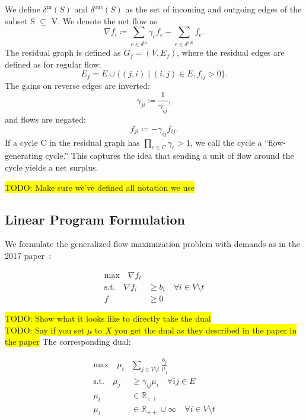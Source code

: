 \documentclass[11pt]{article}
\theoremstyle{definition}
\theoremstyle{definition}
\newcommand{\R}{\mathbb{R}}
\newcommand{\nfi}{\nabla f_i}
\newcommand{\din}{\delta^{\text{in}}}
\newcommand{\dout}{\delta^{\text{out}}}
\newcommand{\todo}[1]{\colorbox{yellow}{TODO: #1}}
\begin{document}
		We define $\din(S)$ and $\dout(S)$ as the set of incoming and outgoing edges of the subset S $\subseteq$ V. We denote the net flow as
    \[ \nfi \coloneqq \sum_{e \in \din} \gamma_e f_e - \sum_{e \in \dout} f_e.\]
    The residual graph is defined as $G_f = (V, E_f)$, where the residual edges are defined
    as for regular flow:
    \[ E_f = E \cup \{ (j, i) \mid (i, j) \in E, f_{ij} > 0 \}. \]
    The gains on reverse edges are inverted:
    \[ \gamma_{ji} \coloneqq \frac{1}{\gamma_{ij}}, \]
    and flows are negated:
    \[ f_{ji} \coloneqq -\gamma_{ij}f_{ij}. \]
    If a cycle C in the residual graph has $\prod_{e \in C} \gamma_e > 1$,
    we call the cycle a ``flow-generating cycle.'' This captures the idea that sending
    a unit of flow around the cycle yields a net surplus.

		\todo{Make sure we've defined all notation we use}

    \subsection{Linear Program Formulation}
    \label{sec:lp}

	We formulate the generalized flow maximization problem with demands as in the 2017 paper~\cite{Olver2017}:
    
        \begin{align*}\tag{P}
        \text{max} \quad
        \nabla f_t& \\
        \text{s.t.} \quad
        \nabla f_i &\geq b_i \quad \forall i \in V \setminus t \\
        f &\geq 0
        \end{align*}        

\todo{Show what it looks like to directly take the dual}\\
\todo{Say if you set $\mu$ to $X$ you get the dual as they described in the paper in the paper}
\noindent The corresponding dual:
 
        \begin{align*}\tag{D}
        \text{max} \quad
        \mu_t &\sum_{j \in V \setminus t} \frac{b_j}{\mu_j}  \\
        \text{s.t.} \quad
        \mu_j &\geq \gamma_{ij}\mu_i \quad \forall ij \in E \\
        \mu_t &\in \R_{++} \\
        \mu_i &\in \R_{++} \cup \infty \quad \forall i \in V \setminus t
        \end{align*}  
        
\end{document}
